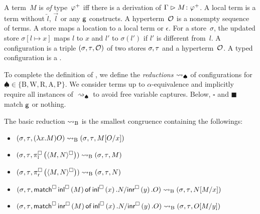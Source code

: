 {A term~$M$ is \textit{of} type~${\varphi}^+$ iff there is a derivation of
$\Gamma\vartriangleright
{M} \colon{{\varphi}^+}$.
A local term is a term without $\overleftarrow l$,
$\overrightarrow l$ or any $\mathsf{g}$ constructs.
A hyperterm~$\mathcal{O}$ is a nonempty sequence of terms.
A store maps a location to a
local term or $\epsilon$.
For a store~$\sigma$, the updated store $\sigma[l\mapsto x]$ maps $l$ to
$x$ and $l'$ to $\sigma(l')$ if $l'$ is different from~$l$.
A configuration is a triple $({\sigma}{},{\tau}{},{\mathcal{O}})$ of two
stores ${\sigma}, {\tau}$ and a hyperterm~$\mathcal{O}$.
A typed configuration is a .

To complete the definition of \lgd,
 we define the \textit{reductions} $\rightsquigarrow_\spadesuit$ of
 configurations for $\spadesuit\in\{\mathrm B, \mathrm W, \mathrm R, \mathrm A,
 \mathrm P\}$.
 We consider terms up to $\alpha$-equivalence and implicitly
 require all instances
 of $\rightsquigarrow_\spadesuit$ to avoid free variable captures.
 Below, $\square$ and $\blacksquare$ match $\mathsf{g}$ or nothing.

\begin{definition}
 The basic reduction $\rightsquigarrow_{\mathrm B}$ is the smallest congruence containing
 the followings:
 \begin{itemize}
  \item  $({\sigma}{},{\tau}{},{(\lambda x.M)O})\rightsquigarrow_{\mathrm B}
 ({\sigma}{},{\tau}{},{M[O/x]})$
  \item $({\sigma}{},{\tau}{},{\pi^{\square}_{\mathrm l}\left({\langle{M,N}\rangle^{\square}}\right)}) \rightsquigarrow_{\mathrm B}
	 ({\sigma}{},{\tau}{},{           M   })$
  \item $({\sigma}{},{\tau}{},{\pi^{\square}_{\mathrm r}\left({\langle{M,N}\rangle^{\square}}\right)}) \rightsquigarrow_{\mathrm B}
	 ({\sigma}{},{\tau}{},{             N })$
  \item $({\sigma}{},{\tau}{},{\mathsf{match}^{\square}\,{\mathsf{inl}^{\square}\left({M}\right)}\,\mathsf{of}\, \mathsf{inl}^{\square}\left({x}\right). {N}/ \mathsf{inr}^{\square}\left({y}\right). {O}}) \rightsquigarrow_{\mathrm B}
	 ({\sigma}{},{\tau}{},{              N[M/x]})$
  \item $({\sigma}{},{\tau}{},{\mathsf{match}^{\square}\,{\mathsf{inr}^{\square}\left({M}\right)}\,\mathsf{of}\, \mathsf{inl}^{\square}\left({x}\right). {N}/ \mathsf{inr}^{\square}\left({y}\right). {O}}) \rightsquigarrow_{\mathrm B}
	 ({\sigma}{},{\tau}{},{                  O[M/y]})$
 \end{itemize}
\end{definition}

}
